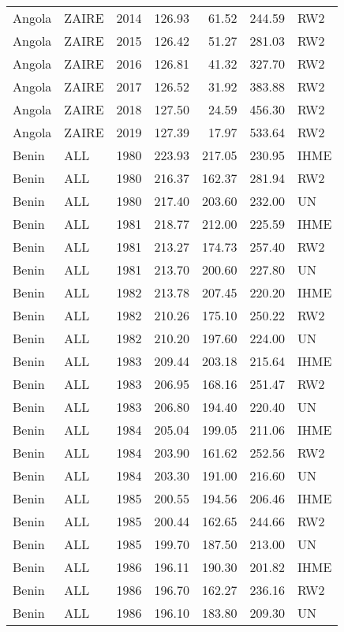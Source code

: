 \begin{longtable}{lllrrrl}
  Angola & ZAIRE & 2014 & 126.93 & 61.52 & 244.59 & RW2 \\ 
  Angola & ZAIRE & 2015 & 126.42 & 51.27 & 281.03 & RW2 \\ 
  Angola & ZAIRE & 2016 & 126.81 & 41.32 & 327.70 & RW2 \\ 
  Angola & ZAIRE & 2017 & 126.52 & 31.92 & 383.88 & RW2 \\ 
  Angola & ZAIRE & 2018 & 127.50 & 24.59 & 456.30 & RW2 \\ 
  Angola & ZAIRE & 2019 & 127.39 & 17.97 & 533.64 & RW2 \\ 
  Benin & ALL & 1980 & 223.93 & 217.05 & 230.95 & IHME \\ 
  Benin & ALL & 1980 & 216.37 & 162.37 & 281.94 & RW2 \\ 
  Benin & ALL & 1980 & 217.40 & 203.60 & 232.00 & UN \\ 
  Benin & ALL & 1981 & 218.77 & 212.00 & 225.59 & IHME \\ 
  Benin & ALL & 1981 & 213.27 & 174.73 & 257.40 & RW2 \\ 
  Benin & ALL & 1981 & 213.70 & 200.60 & 227.80 & UN \\ 
  Benin & ALL & 1982 & 213.78 & 207.45 & 220.20 & IHME \\ 
  Benin & ALL & 1982 & 210.26 & 175.10 & 250.22 & RW2 \\ 
  Benin & ALL & 1982 & 210.20 & 197.60 & 224.00 & UN \\ 
  Benin & ALL & 1983 & 209.44 & 203.18 & 215.64 & IHME \\ 
  Benin & ALL & 1983 & 206.95 & 168.16 & 251.47 & RW2 \\ 
  Benin & ALL & 1983 & 206.80 & 194.40 & 220.40 & UN \\ 
  Benin & ALL & 1984 & 205.04 & 199.05 & 211.06 & IHME \\ 
  Benin & ALL & 1984 & 203.90 & 161.62 & 252.56 & RW2 \\ 
  Benin & ALL & 1984 & 203.30 & 191.00 & 216.60 & UN \\ 
  Benin & ALL & 1985 & 200.55 & 194.56 & 206.46 & IHME \\ 
  Benin & ALL & 1985 & 200.44 & 162.65 & 244.66 & RW2 \\ 
  Benin & ALL & 1985 & 199.70 & 187.50 & 213.00 & UN \\ 
  Benin & ALL & 1986 & 196.11 & 190.30 & 201.82 & IHME \\ 
  Benin & ALL & 1986 & 196.70 & 162.27 & 236.16 & RW2 \\ 
  Benin & ALL & 1986 & 196.10 & 183.80 & 209.30 & UN \\ 

\end{longtable}
